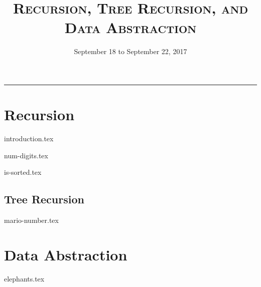 \documentclass{exam}
\title{\textsc{Recursion, Tree Recursion, and Data Abstraction}}
\date{September 18 to September 22, 2017}
\begin{document}
\maketitle
\rule{\textwidth}{0.15em}
\fontsize{12}{15}\selectfont


\section{Recursion}
{introduction.tex}
\begin{questions}
{num-digits.tex}

\begin{blocksection}
{is-sorted.tex}

\end{blocksection}

\begin{blocksection}
\section{Tree Recursion}
{mario-number.tex}
\end{blocksection}


\section{Data Abstraction}
{elephants.tex}
\end{questions}
\end{document}
